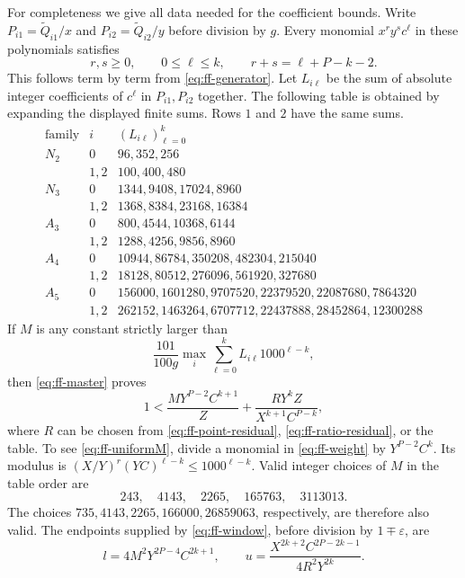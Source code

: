 \documentclass[12pt]{article}
\numberwithin{equation}{section}
\begin{document}
For completeness we give all data needed for the coefficient bounds.
Write $P_{i1}=\widetilde Q_{i1}/x$ and $P_{i2}=\widetilde Q_{i2}/y$ before division by $g$.
Every monomial $x^r y^s c^\ell$ in these polynomials satisfies
\begin{equation}\label{eq:ff-weight}
 r,s\ge0,\qquad 0\le\ell\le k,\qquad r+s=\ell+P-k-2.
\end{equation}
This follows term by term from \eqref{eq:ff-generator}.
Let $L_{i\ell}$ be the sum of absolute integer coefficients of
$c^\ell$ in $P_{i1},P_{i2}$ together. The following table is obtained
by expanding the displayed finite sums. Rows $1$ and $2$ have the same sums.
\[
\begin{array}{c|c|l}
 \text{family}&i&(L_{i\ell})_{\ell=0}^k\\ \hline
N_2&0&96,352,256\\
 &1,2&100,400,480\\
N_3&0&1344,9408,17024,8960\\
 &1,2&1368,8384,23168,16384\\
A_3&0&800,4544,10368,6144\\
 &1,2&1288,4256,9856,8960\\
A_4&0&10944,86784,350208,482304,215040\\
 &1,2&18128,80512,276096,561920,327680\\
A_5&0&156000,1601280,9707520,22379520,22087680,7864320\\
 &1,2&262152,1463264,6707712,22437888,28452864,12300288
\end{array}
\]
If $M$ is any constant strictly larger than
\begin{equation}\label{eq:ff-uniformM}
 \frac{101}{100g}\max_i\sum_{\ell=0}^k
                       L_{i\ell}1000^{\ell-k},
\end{equation}
then \eqref{eq:ff-master} proves
\begin{equation}\label{eq:ff-two-inequality}
 1<\frac{M Y^{P-2}C^{k+1}}Z
       +\frac{R Y^kZ}{X^{k+1}C^{P-k}},
\end{equation}
where $R$ can be chosen from \eqref{eq:ff-point-residual},
\eqref{eq:ff-ratio-residual}, or the table.
To see \eqref{eq:ff-uniformM}, divide a monomial in
\eqref{eq:ff-weight} by $Y^{P-2}C^k$. Its modulus is
$(X/Y)^r(YC)^{\ell-k}\le1000^{\ell-k}$.
Valid integer choices of $M$ in the table order are
\[
 243,\quad4143,\quad2265,\quad165763,\quad3113013.
\]
The choices $735,4143,2265,166000,26859063$, respectively,
are therefore also valid. The endpoints supplied by
\eqref{eq:ff-window}, before division by $1\mp\varepsilon$, are
\begin{equation}\label{eq:ff-two-endpoints}
 l=4M^2Y^{2P-4}C^{2k+1},\qquad
 u=\frac{X^{2k+2}C^{2P-2k-1}}{4R^2Y^{2k}}.
\end{equation}
\end{document}
